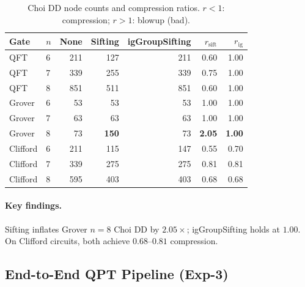 \documentclass[11pt,a4paper]{article}
\begin{document}
\begin{table}[h]
\centering
\caption{Choi DD node counts and compression ratios.
  $r < 1$: compression; $r > 1$: blowup (bad).}
\label{tab:compress}
\begin{tabular}{llrrrrr}
\toprule
Gate & $n$ & None & Sifting & igGroupSifting & $r_{\mathrm{sift}}$ & $r_{\mathrm{ig}}$ \\
\midrule
QFT      & 6 & 211 & 127 & 211 & 0.60 & 1.00 \\
QFT      & 7 & 339 & 255 & 339 & 0.75 & 1.00 \\
QFT      & 8 & 851 & 511 & 851 & 0.60 & 1.00 \\
\midrule
Grover   & 6 &  53 &  53 &  53 & 1.00 & 1.00 \\
Grover   & 7 &  63 &  63 &  63 & 1.00 & 1.00 \\
Grover   & 8 &  73 & \textbf{150} & 73 & \textbf{2.05} & \textbf{1.00} \\
\midrule
Clifford & 6 & 211 & 115 & 147 & 0.55 & 0.70 \\
Clifford & 7 & 339 & 275 & 275 & 0.81 & 0.81 \\
Clifford & 8 & 595 & 403 & 403 & 0.68 & 0.68 \\
\bottomrule
\end{tabular}
\end{table}

\paragraph{Key findings.}
Sifting inflates Grover $n=8$ Choi DD by $2.05\times$; igGroupSifting holds at $1.00$.
On Clifford circuits, both achieve $0.68$--$0.81$ compression.

\subsection{End-to-End QPT Pipeline (Exp-3)}
\end{document}
